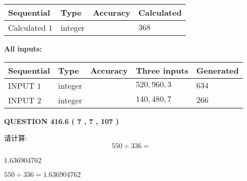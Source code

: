 \documentclass{ctexart}
\begin{document}
   
  
  
\noindent\begin{tabular}{|l|l|l|l|}
\hline
 Sequential & Type & Accuracy & Calculated \\ 
\hline
 
 
  Calculated $  1 $ & integer &  & 
  $ 368 $ 
 \\  \hline  
 \end{tabular}
   
   
   
   
\noindent\vspace{0.1in}\hspace{-0.08in} {\textbf{\Large{All inputs: }}}
   
   
  
  
\noindent\begin{tabular}{|l|l|l|l|l|}
\hline
 Sequential & Type & Accuracy & Three inputs & Generated \\ 
\hline
 
 
  INPUT $  1 $ & integer &  & $
 520
 , 
 960
 , 
 3
 $ & $ 634 $ 
 \\  \hline  
 
 
  INPUT $  2 $ & integer &  & $
 140
 , 
 480
 , 
 7
 $ & $ 266 $ 
 \\  \hline  
 \end{tabular}
   
   
  
\vspace{0.2in}
  
{\textbf{\Large{QUESTION
416.6 
 ( 7 , 7 , 107 )
}}}
  
  
 
请计算:
\begin{equation}
550  \div    %
336 = \nonumber
\end{equation}
 
 
 
\noindent{}
 
 

1.636904762
 
 
\noindent{}
 
 

 
 
 
\noindent{}
 
 

$ %
550 \div  %
336=   %
1.636904762$
 
\end{document}
